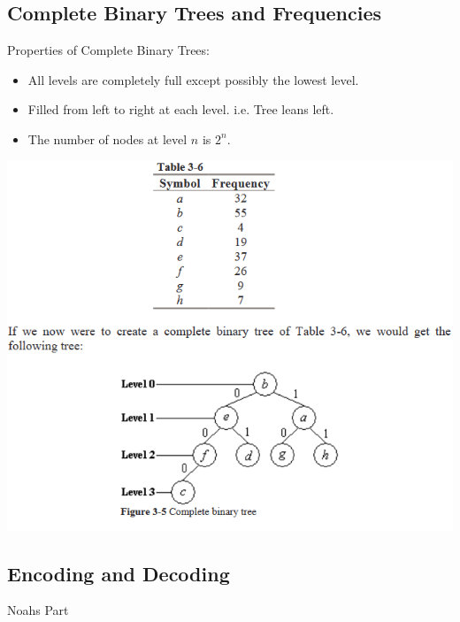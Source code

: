 \documentclass{beamer}
\begin{document}
\subsection{Complete Binary Trees and Frequencies}
\begin{frame}
Properties of Complete Binary Trees:
\begin{itemize}
\item All levels are completely full except possibly the lowest level.
\item Filled from left to right at each level. i.e. Tree leans left.
\item The number of nodes at level $n$ is $2^n$.
\end{itemize}
\end{frame}

\begin{frame}
\begin{center}
\includegraphics[scale=0.55]{example}
\end{center}
\end{frame}

\subsection{Encoding and Decoding}
\begin{frame}
Noahs Part
\end{frame}
\end{document}
